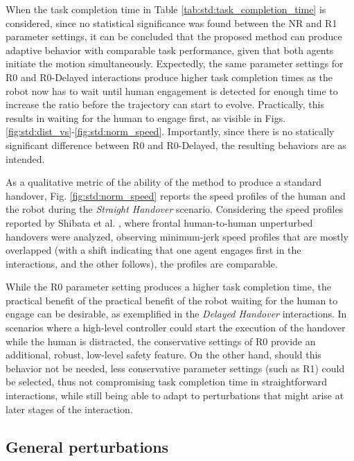 \documentclass[lettersize,journal]{IEEEtran}
\begin{document}
When the task completion time in Table \ref{tab:std:task_completion_time} is considered, since no statistical significance was found between the NR and R1 parameter settings, it can be concluded that the proposed method can produce adaptive behavior with comparable task performance, given that both agents initiate the motion simultaneously. 
Expectedly, the same parameter settings for R0 and R0-Delayed interactions produce higher task completion times as the robot now has to wait until human engagement is detected for enough time to increase the ratio before the trajectory can start to evolve.
Practically, this results in waiting for the human to engage first, as visible in Figs. \ref{fig:std:dist_vs}-\ref{fig:std:norm_speed}.
Importantly, since there is no statically significant difference between R0 and R0-Delayed, the resulting behaviors are as intended.

As a qualitative metric of the ability of the method to produce a standard handover, Fig. \ref{fig:std:norm_speed} reports the speed profiles of the human and the robot during the \textit{Straight Handover} scenario.
Considering the speed profiles reported by Shibata et al. \cite{shibata_experimental_1995}, where frontal human-to-human unperturbed handovers were analyzed, observing minimum-jerk speed profiles that are mostly overlapped (with a shift indicating that one agent engages first in the interactions, and the other follows), the profiles are comparable.

While the R0 parameter setting produces a higher task completion time, the practical benefit of the practical benefit of the robot waiting for the human to engage can be desirable, as exemplified in the \textit{Delayed Handover} interactions.
In scenarios where a high-level controller could start the execution of the handover while the human is distracted, the conservative settings of R0 provide an additional, robust, low-level safety feature.
On the other hand, should this behavior not be needed, less conservative parameter settings (such as R1) could be selected, thus not compromising task completion time in straightforward interactions, while still being able to adapt to perturbations that might arise at later stages of the interaction.

\subsection{General perturbations}
\end{document}
